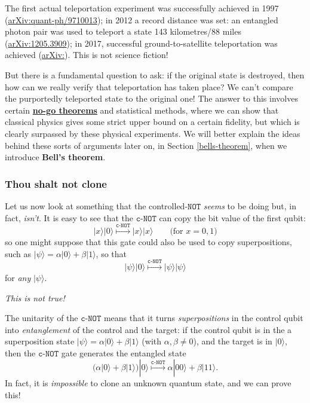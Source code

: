 \documentclass[fleqn]{article}
\newenvironment{technical}{\noindent}{\medskip}
\begin{document}
\begin{technical}
The first actual teleportation experiment was successfully achieved in 1997 (\href{https://arxiv.org/abs/quant-ph/9710013}{arXiv:quant-ph/9710013}); in 2012 a record distance was set: an entangled photon pair was used to teleport a state 143 kilometres/88 miles (\href{https://arxiv.org/abs/1205.3909}{arXiv:1205.3909}); in 2017, successful ground-to-satellite teleportation was achieved (\href{https://arxiv.org/abs/1707.00934}{arXiv:}).
This is not science fiction!

But there is a fundamental question to ask: if the original state is destroyed, then how can we really verify that teleportation has taken place?
We can't compare the purportedly teleported state to the original one!
The answer to this involves certain \href{https://en.wikipedia.org/wiki/No-go_theorem}{\textbf{no-go theorems}} and statistical methods, where we can show that classical physics gives some strict upper bound on a certain fidelity, but which is clearly surpassed by these physical experiments.
We will better explain the ideas behind these sorts of arguments later on, in Section \ref{bells-theorem}, when we introduce \textbf{Bell's theorem}.

\end{technical}

\hypertarget{thou-shalt-not-clone}{%
\subsubsection{Thou shalt not clone}\label{thou-shalt-not-clone}}

Let us now look at something that the controlled-\(\texttt{NOT}\) \emph{seems} to be doing but, in fact, \emph{isn't}.
It is easy to see that the \(\texttt{c-NOT}\) can copy the bit value of the first qubit:
\[
  |x\rangle|0\rangle \overset{\texttt{c-NOT}}{\longmapsto} |x\rangle|x\rangle
  \qquad\text{(for $x=0,1$)}
\]
so one might suppose that this gate could also be used to copy superpositions, such as \(|\psi\rangle = \alpha|0\rangle+\beta|1\rangle\), so that
\[
  |\psi\rangle|0\rangle \overset{\texttt{c-NOT}}{\longmapsto} |\psi\rangle|\psi\rangle
\]
for \emph{any} \(|\psi\rangle\).

\emph{This is not true!}

The unitarity of the \(\texttt{c-NOT}\) means that it turns \emph{superpositions} in the control qubit into \emph{entanglement} of the control and the target: if the control qubit is in the a superposition state \(|\psi\rangle = \alpha|0\rangle+\beta|1\rangle\) (with \(\alpha,\beta\neq0\)), and the target is in \(|0\rangle\), then the \(\texttt{c-NOT}\) gate generates the entangled state
\[
  \big( \alpha|0\rangle+\beta|1\rangle \big) |0\rangle
  \overset{\texttt{c-NOT}}{\longmapsto}
  \alpha|00\rangle + \beta|11\rangle.
\]
In fact, it is \emph{impossible} to clone an unknown quantum state, and we can prove this!
\end{document}
